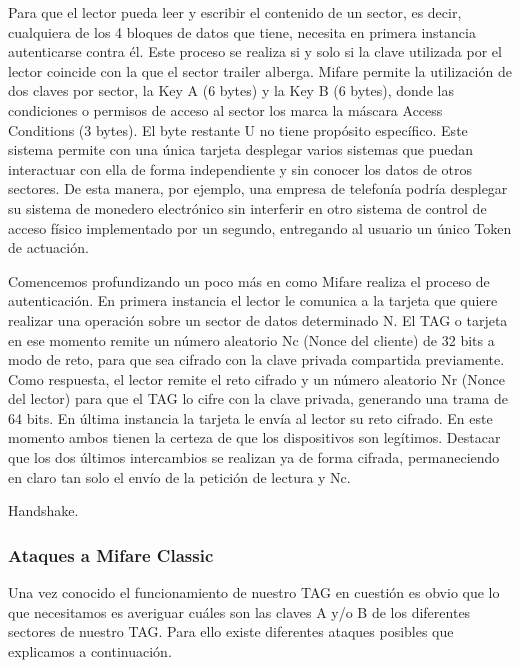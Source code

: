

Para que el lector pueda leer y escribir el contenido de un sector, es
decir, cualquiera de los 4 bloques de datos que tiene, necesita en
primera instancia autenticarse contra él. Este proceso se realiza si y
solo si la clave utilizada por el lector coincide con la que el sector
trailer alberga. Mifare permite la utilización de dos claves por sector,
la Key A (6 bytes) y la Key B (6 bytes), donde las condiciones o
permisos de acceso al sector los marca la máscara Access Conditions (3
bytes). El byte restante U no tiene propósito específico. Este sistema
permite con una única tarjeta desplegar varios sistemas que puedan
interactuar con ella de forma independiente y sin conocer los datos de
otros sectores. De esta manera, por ejemplo, una empresa de telefonía
podría desplegar su sistema de monedero electrónico sin interferir en
otro sistema de control de acceso físico implementado por un segundo,
entregando al usuario un único Token de actuación.

Comencemos profundizando un poco más en como Mifare realiza el proceso
de autenticación. En primera instancia el lector le comunica a la
tarjeta que quiere realizar una operación sobre un sector de datos
determinado N. El TAG o tarjeta en ese momento remite un número
aleatorio Nc (Nonce del cliente) de 32 bits a modo de reto, para que sea
cifrado con la clave privada compartida previamente. Como respuesta, el
lector remite el reto cifrado y un número aleatorio Nr (Nonce del
lector) para que el TAG lo cifre con la clave privada, generando una
trama de 64 bits. En última instancia la tarjeta le envía al lector su
reto cifrado. En este momento ambos tienen la certeza de que los
dispositivos son legítimos. Destacar que los dos últimos intercambios se
realizan ya de forma cifrada, permaneciendo en claro tan solo el envío
de la petición de lectura y Nc.

 Handshake.

\subsubsection{Ataques a Mifare Classic}\label{ataques-a-mifare-classic}

Una vez conocido el funcionamiento de nuestro TAG en cuestión es obvio
que lo que necesitamos es averiguar cuáles son las claves A y/o B de los
diferentes sectores de nuestro TAG. Para ello existe diferentes ataques
posibles que explicamos a continuación.

